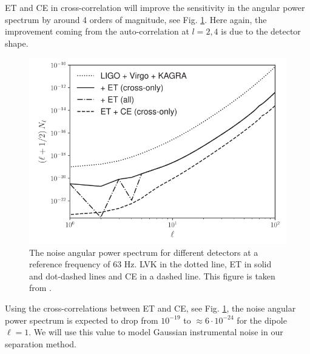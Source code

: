 ET and CE in cross-correlation will improve the sensitivity in the angular power spectrum by around 4 orders of magnitude, see Fig. \ref{ET_Cl}.  Here again, the improvement coming from the auto-correlation at $l=2, 4$ is due to the detector shape.

\begin{figure}[h]
    \centering
    \includegraphics[width=0.7\linewidth]{Images/et_ce_Cl_noise.png}
    \caption[The noise angular power spectrum for different detectors at a reference frequency of 63 Hz.]{The noise angular power spectrum for different detectors at a reference frequency of 63 Hz. LVK in the dotted line, ET in solid and dot-dashed lines and CE in a dashed line. This figure is taken from \cite{alonso_noise_2020}.}
    \label{ET_Cl}
\end{figure} 

Using the cross-correlations between ET and CE, see Fig. \ref{ET_Cl}, the noise angular power spectrum is expected to drop from $10^{-19}$ to $\approx 6\cdot 10^{-24}$ for the dipole $\ell =1$. We will use this value to model Gaussian instrumental noise in our separation method.